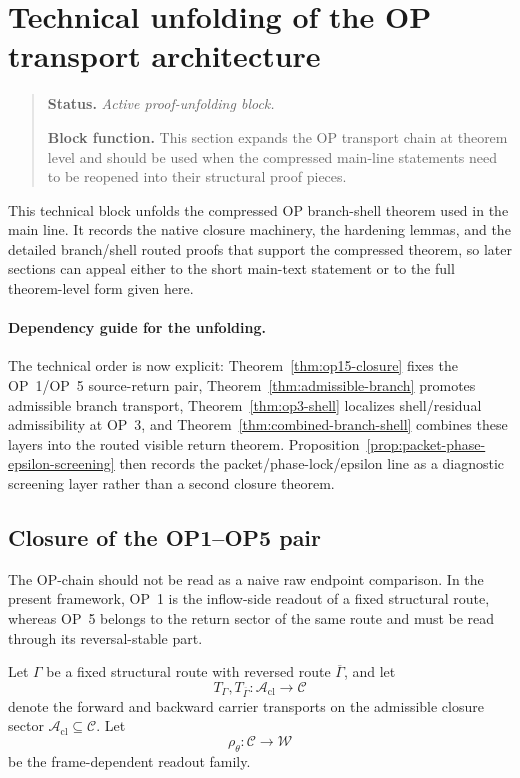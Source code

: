 \section*{Technical unfolding of the OP transport architecture}
\begin{quote}\small
\noindent\textbf{Status.} \emph{Active proof-unfolding block.}\par
\noindent\textbf{Block function.} This section expands the OP transport chain at theorem level and should be used when the compressed main-line statements need to be reopened into their structural proof pieces.
\end{quote}
This technical block unfolds the compressed OP branch-shell theorem used in the main line. It records the native closure machinery, the hardening lemmas, and the detailed branch/shell routed proofs that support the compressed theorem, so later sections can appeal either to the short main-text statement or to the full theorem-level form given here.

\paragraph{Dependency guide for the unfolding.}\label{par:op-unfolding-dependency-guide}
The technical order is now explicit: Theorem~\ref{thm:op15-closure} fixes the OP~1/OP~5 source-return pair, Theorem~\ref{thm:admissible-branch} promotes admissible branch transport, Theorem~\ref{thm:op3-shell} localizes shell/residual admissibility at OP~3, and Theorem~\ref{thm:combined-branch-shell} combines these layers into the routed visible return theorem. Proposition~\ref{prop:packet-phase-epsilon-screening} then records the packet/phase-lock/epsilon line as a diagnostic screening layer rather than a second closure theorem.

\subsection{Closure of the OP1--OP5 pair}

The OP-chain should not be read as a naive raw endpoint comparison. In the present framework, OP~1 is the inflow-side readout of a fixed structural route, whereas OP~5 belongs to the return sector of the same route and must be read through its reversal-stable part.

Let $\Gamma$ be a fixed structural route with reversed route $\overline{\Gamma}$, and let
\[
T_{\Gamma},T_{\overline{\Gamma}}:\mathcal{A}_{\mathrm{cl}}\to\mathcal{C}
\]
denote the forward and backward carrier transports on the admissible closure sector $\mathcal{A}_{\mathrm{cl}}\subseteq\mathcal{C}$. Let
\[
\rho_{\theta}:\mathcal{C}\to\mathcal{W}
\]
be the frame-dependent readout family.

